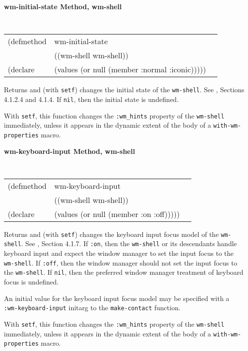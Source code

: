 {\samepage
{\large {\bf wm-initial-state \hfill Method, wm-shell}}
\begin{flushright} \parbox[t]{6.125in}{
\tt
\begin{tabular}{lll}
\raggedright
(defmethod & wm-initial-state & \\
           & ((wm-shell  wm-shell)) \\
(declare   & (values (or null (member :normal :iconic)))))
\end{tabular}
\rm

}\end{flushright}}

\begin{flushright} \parbox[t]{6.125in}{
Returns and (with {\tt setf}) changes the initial state of the {\tt wm-shell}. 
See \cite{icccm}, Sections 4.1.2.4 and 4.1.4. If {\tt nil}, then the initial state is
undefined. 

With {\tt setf}, this function changes the {\tt :wm\_hints} property of
the {\tt wm-shell} immediately, unless it appears in the dynamic extent of the
body of a {\tt with-wm-properties} macro.
}\end{flushright}


{\samepage
{\large {\bf wm-keyboard-input \hfill Method, wm-shell}}
\begin{flushright} \parbox[t]{6.125in}{
\tt
\begin{tabular}{lll}
\raggedright
(defmethod & wm-keyboard-input & \\
           & ((wm-shell  wm-shell)) \\
(declare   & (values (or null (member :on :off)))))
\end{tabular}
\rm

}\end{flushright}}

\begin{flushright} \parbox[t]{6.125in}{ Returns and (with {\tt setf}) changes
the keyboard input focus model of the {\tt wm-shell}.  See \cite{icccm}, Section
4.1.7.  If {\tt :on}, then the {\tt wm-shell} or its descendants handle keyboard
input and expect the window manager to set the input focus to the {\tt
wm-shell}.  If {\tt :off}, then the window manager should not set the input
focus to the {\tt wm-shell}. If {\tt nil}, then the preferred window manager
treatment of keyboard focus is undefined. 

An initial value for the keyboard input focus model may be specified with a {\tt
:wm-keyboard-input} initarg to the {\tt make-contact} function.

With {\tt setf}, this function changes the {\tt :wm\_hints} property of
the {\tt wm-shell} immediately, unless it appears in the dynamic extent of the
body of a {\tt with-wm-properties} macro.

}\end{flushright}



